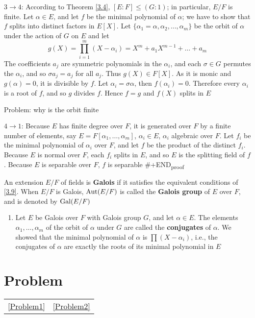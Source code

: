 \documentclass[11pt]{article}
\begin{document}
\(3\to 4\): According to Theorem \ref{3.4}, \([E:F]\le(G:1)\); in particular, \(E/F\) is finite.
Let \(\alpha\in E\), and let \(f\) be the minimal polynomial of \(\alpha\); we have to show that \(f\) splits
into distinct factors in \(E[X]\). Let \(\{\alpha_1=\alpha,\alpha_2,\dots,\alpha_m\}\) be the orbit of \(\alpha\) under the action
of \(G\) on \(E\)
and let
\begin{equation*}
g(X)=\prod_{i=1}^m(X-\alpha_i)=X^m+a_1X^{m-1}+\dots+a_m
\end{equation*}
The coefficients \(a_j\) are symmetric polynomials in the \(\alpha_i\), and each \(\sigma\in G\) permutes
the \(\alpha_i\), and so \(\sigma a_j=a_j\) for all \(a_j\). Thus \(g(X)\in F[X]\). As it is monic
and \(g(\alpha)=0\), it is divisible by \(f\). Let \(\alpha_i=\sigma\alpha\), then \(f(\alpha_i)=0\). Therefore
every \(\alpha_i\) is a root of \(f\), and so \(g\) divides \(f\). Hence \(f=g\) and \(f(X)\) splits
in \(E\)

Problem: why is the orbit finite \label{Problem2}

\(4\to 1\): Because \(E\) has finite degree over \(F\), it is generated over \(F\) by a finite
number of elements, say \(E=F[\alpha_1,\dots,\alpha_m]\), \(\alpha_i\in E\), \(\alpha_i\) algebraic over \(F\). Let \(f_i\) be
the minimal polynomial of \(\alpha_i\) over \(F\), and let \(f\) be the product of the
distinct \(f_i\). Because \(E\) is normal over \(F\), each \(f_i\) splits in \(E\), and so \(E\)
is the splitting field of \(f\). Because \(E\) is separable over \(F\), \(f\) is separable
\#+END\textsubscript{proof}

\begin{definition}[]
An extension \(E/F\) of fields is \textbf{Galois} if it satisfies the equivalent conditions of \ref{3.9}.
When \(E/F\) is Galois, \(\operatorname{\text{Aut}}(E/F)\) is called the \textbf{Galois group} of \(E\) over \(F\), and is
denoted by \(\operatorname{Gal}(E/F)\)
\end{definition}

\begin{remark}
\begin{enumerate}
\item Let \(E\) be Galois over \(F\) with Galois group \(G\), and let \(\alpha\in E\). The
elements \(\alpha_1,\dots,\alpha_m\) of the orbit of \(\alpha\) under \(G\) are called the \textbf{conjugates} of \(\alpha\). We showed
that the minimal polynomial of \(\alpha\) is \(\prod(X-\alpha_i)\), i.e., the conjugates of \(\alpha\) are exactly the
roots of its minimal polynomial in \(E\)
\end{enumerate}
\end{remark}



\section{Problem}
\label{sec:org3b4a320}
\begin{center}
\begin{tabular}{ll}
\ref{Problem1} & \ref{Problem2}\\
\end{tabular}
\end{center}
\end{document}
